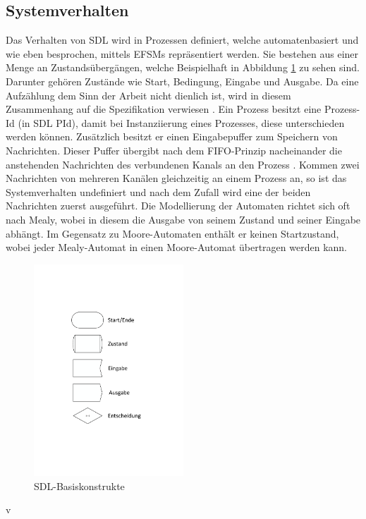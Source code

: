 \subsection{Systemverhalten}
\label{ssc:Verhalten}
Das Verhalten von \ac{SDL} wird in Prozessen definiert, welche automatenbasiert und wie eben besprochen, mittels \ac{EFSM}s repräsentiert werden. Sie bestehen aus einer Menge an Zustandsübergängen, welche Beispielhaft in Abbildung \ref{fig:Basiskonstrukte} zu sehen sind. Darunter gehören Zustände wie Start, Bedingung, Eingabe und Ausgabe. Da eine Aufzählung dem Sinn der Arbeit nicht dienlich ist, wird in diesem Zusammenhang auf die Spezifikation verwiesen \cite[44 \psqq]{ITUT101_2016}.
Ein Prozess besitzt eine Prozess-Id (in \ac{SDL} PId), damit bei Instanziierung eines Prozesses, diese unterschieden werden können. Zusätzlich besitzt er einen Eingabepuffer zum Speichern von Nachrichten. Dieser Puffer übergibt nach dem \ac{FIFO}-Prinzip nacheinander die anstehenden Nachrichten des verbundenen Kanals an den Prozess \cite[42]{ITUT101_2016}. Kommen zwei Nachrichten von mehreren Kanälen gleichzeitig an einem Prozess an, so ist das Systemverhalten undefiniert und nach dem Zufall wird eine der beiden Nachrichten zuerst ausgeführt.
Die Modellierung der Automaten richtet sich oft nach Mealy, wobei in diesem die Ausgabe von seinem Zustand und seiner Eingabe abhängt.
Im Gegensatz zu Moore-Automaten enthält er keinen Startzustand, wobei jeder Mealy-Automat in einen Moore-Automat übertragen werden kann.


\begin{figure}[h]
	\centering
	\includegraphics[width=0.5\textwidth]{Graphics/Basiskonstrukte.pdf}
	\caption{SDL-Basiskonstrukte}
	\label{fig:Basiskonstrukte}
\end{figure}v


